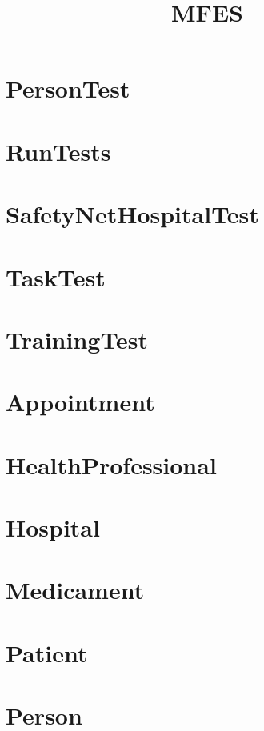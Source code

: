 \documentclass{article}
\begin{document}
\title{MFES}
\author{}
\maketitle
\tableofcontents

\section{PersonTest}

\section{RunTests}

\section{SafetyNetHospitalTest}

\section{TaskTest}

\section{TrainingTest}

\section{Appointment}

\section{HealthProfessional}

\section{Hospital}

\section{Medicament}

\section{Patient}

\section{Person}

\end{document}
